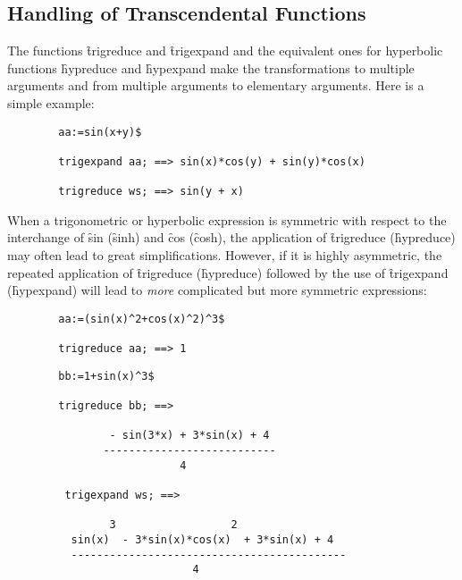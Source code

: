 \subsection{Handling of Transcendental Functions}
\hypertarget{operator:TRIGEXPAND}{}
\hypertarget{operator:TRIGREDUCE}{}
\hypertarget{operator:HYPEXPAND}{}
\hypertarget{operator:HYPREDUCE}{}
The functions \f{trigreduce} and \f{trigexpand} and the equivalent
ones for hyperbolic functions \f{hypreduce} and \f{hypexpand}
make the transformations to multiple arguments and from
multiple arguments to elementary arguments. Here is a simple example:
\begin{verbatim}
        aa:=sin(x+y)$

        trigexpand aa; ==> sin(x)*cos(y) + sin(y)*cos(x)

        trigreduce ws; ==> sin(y + x)
\end{verbatim}
When a trigonometric or hyperbolic expression is symmetric with
respect to the interchange of \f{sin} (\f{sinh}) and \f{cos} (\f{cosh}),
the application of \f{trigreduce} (\f{hypreduce}) may often lead to great
simplifications. However, if it is highly asymmetric, the repeated
application of \f{trigreduce} (\f{hypreduce}) followed by the use of
\f{trigexpand} (\f{hypexpand}) will lead to \emph{more} complicated
but more symmetric expressions:
\begin{verbatim}
        aa:=(sin(x)^2+cos(x)^2)^3$

        trigreduce aa; ==> 1
\end{verbatim}
\begin{verbatim}
        bb:=1+sin(x)^3$

        trigreduce bb; ==>

                - sin(3*x) + 3*sin(x) + 4
               ---------------------------
                           4

         trigexpand ws; ==>

                3                  2
          sin(x)  - 3*sin(x)*cos(x)  + 3*sin(x) + 4
          -------------------------------------------
                             4
\end{verbatim}
